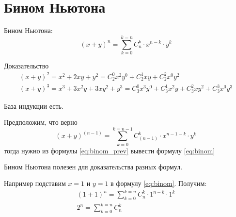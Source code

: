 \section{Бином Ньютона}\label{section:binom}

\begin{frame}

Бином Ньютона:
\begin{equation}\label{eq:binom}
\left( x + y\right)^n = \sum_{k=0}^{k=n} C_n^k \cdot x^{n-k} \cdot y^{k}
\end{equation}

Доказательство
\begin{equation*}
\begin{matrix}
\left( x + y\right)^2 = x^2 + 2xy + y^2 = C_{2}^0 x^2 y^0 + C_{2}^{1} xy + C_{2}^{2}x^0y^2 \\
\left( x + y\right)^3 = x^3 + 3x^2y + 3xy^2 + y^3 = C_{3}^{0}x^3y^0 + C_{3}^{1}x^2y + C_{3}^{2}xy^2 + C_{3}^{3}x^0y^3  
\end{matrix}
\end{equation*}


База индукции есть.

Предположим, что верно 
\begin{equation}\label{eq:binom_prev}
\left( x + y\right)^(n-1) = \sum_{k=0}^{k=n-1} C_{(n-1)}^k \cdot x^{n-1-k} \cdot y^{k}
\end{equation}
тогда нужно из формулы \eqref{eq:binom_prev}
вывести формулу \eqref{eq:binom}

\end{frame}

\begin{frame}
Бином Ньютона полезен для доказательства разных формул.	

Например подставим $x=1$ и $y=1$ в формулу \eqref{eq:binom}.
Получим:
\begin{equation}
\begin{matrix}
(1+1)^n = \sum_{k=0}^{k=n} C_n^k \cdot 1^{n-k} \cdot 1^{k} \\
2^n = \sum_{k=0}^{k=n} C_n^k
\end{matrix}
\end{equation}


\end{frame}



